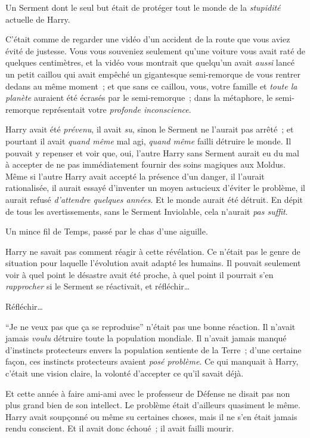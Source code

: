 Un Serment dont le seul but était de protéger tout le monde de la \emph{stupidité} actuelle de Harry.

C'était comme de regarder une vidéo d'un accident de la route que vous aviez évité de justesse.
Vous vous souveniez seulement qu'une voiture vous avait raté de quelques centimètres, et la vidéo vous montrait que quelqu'un avait \emph{aussi} lancé un petit caillou qui avait empêché un gigantesque semi-remorque de vous rentrer dedans au même moment~; et que sans ce caillou, vous, votre famille et \emph{toute la planète} auraient été écrasés par le semi-remorque~; dans la métaphore, le semi-remorque représentait votre \emph{profonde inconscience}.

Harry avait été \emph{prévenu}, il avait \emph{su}, sinon le Serment ne l'aurait pas arrêté~; et pourtant il avait \emph{quand même} mal agi, \emph{quand même} failli détruire le monde.
Il pouvait y repenser et voir que, oui, l'autre Harry sans Serment aurait eu du mal à accepter de ne pas immédiatement fournir des soins magiques aux Moldus.
Même si l'autre Harry avait accepté la présence d'un danger, il l'aurait rationalisée, il aurait essayé d'inventer un moyen astucieux d'éviter le problème, il aurait refusé \emph{d'attendre quelques années}.
Et le monde aurait été détruit.
En dépit de tous les avertissements, sans le Serment Inviolable, cela n'aurait \emph{pas suffit}.

Un mince fil de Temps, passé par le chas d'une aiguille.

Harry ne savait pas comment réagir à cette révélation.
Ce n'était pas le genre de situation pour laquelle l'évolution avait adapté les humains.
Il pouvait seulement voir à quel point le désastre avait été proche, à quel point il pourrait s'en \emph{rapprocher} si le Serment se réactivait, et réfléchir…

Réfléchir…

“Je ne veux pas que ça se reproduise” n'était pas une bonne réaction.
Il n'avait jamais \emph{voulu} détruire toute la population mondiale.
Il n'avait jamais manqué d'instincts protecteurs envers la population sentiente de la Terre~; d'une certaine façon, ces instincts protecteurs avaient \emph{posé problème}.
Ce qui manquait à Harry, c'était une vision claire, la volonté d'accepter ce qu'il savait déjà.

Et cette année à faire ami-ami avec le professeur de Défense ne disait pas non plus grand bien de son intellect.
Le problème était d'ailleurs quasiment le même.
Harry avait soupçonné ou même su certaines choses, mais il ne s'en était jamais rendu conscient.
Et il avait donc échoué~; il avait failli mourir.

